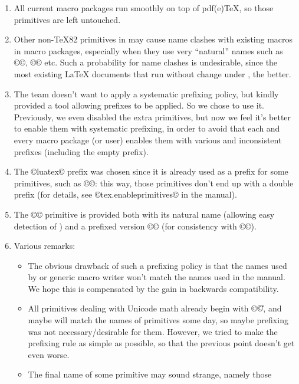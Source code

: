 \documentclass{lltxdoc}
\begin{document}
\begin{myquote}
  \begin{enumerate}
    \item All current macro packages run smoothly on top of pdf(e)TeX, so
      those primitives are left untouched.
    \item Other non-TeX82 primitives in \luatex may cause name clashes with
      existing macros in macro packages, especially when they use very
      ``natural'' names such as ©\outputbox©, ©\mathstyle© etc. Such a
      probability for name clashes is undesirable, since the most existing
      LaTeX documents that run without change under \luatex, the better.
    \item The \luatex team doesn't want to apply a systematic prefixing policy,
      but kindly provided a tool allowing prefixes to be applied. So we chose
      to use it.  Previously, we even disabled the extra primitives, but now
      we feel it's better to enable them with systematic prefixing, in order
      to avoid that each and every macro package (or user) enables them with
      various and inconsistent prefixes (including the empty prefix).
    \item The ©luatex© prefix was chosen since it is already used as a prefix
      for some primitives, such as ©\luatexversion©: this way, those
      primitives don't end up with a double prefix (for details, see
      ©tex.enableprimitives© in the \luatex manual).
    \item The ©\directlua© primitive is provided both with its natural name
      (allowing easy detection of \luatex) and a prefixed version
      ©\luatexdirectlua© (for consistency with ©\luatexlatelua©).
    \item Various remarks:
      \begin{itemize}
        \item The obvious drawback of such a prefixing policy is that the
          names used by \latex or generic macro writer won't match the names
          used in the manual.  We hope this is compensated by the gain in
          backwards compatibility.
        \item All primitives dealing with Unicode math already begin with ©\U©,
          and maybe will match the names of \xetex primitives some day, so
          maybe prefixing was not necessary/desirable for them. However, we
          tried to make the prefixing rule as simple as possible, so that
          the previous point doesn't get even worse.
        \item The final name of some primitive may sound strange, namely those

\end{itemize}
\end{enumerate}
\end{myquote}
\end{document}
